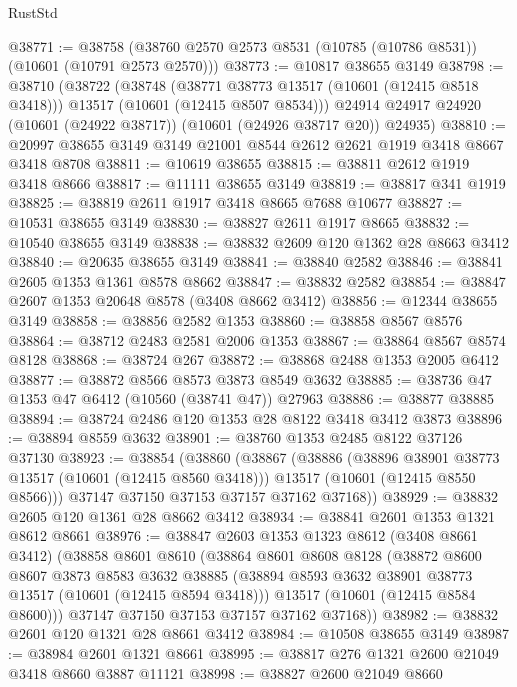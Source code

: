 \begin{lexlean}{RustStd}
\begin{coremodule}
@38771 := @38758 (@38760 @2570 @2573 @8531 (@10785 (@10786 @8531)) (@10601 (@10791 @2573 @2570)))
@38773 := @10817 @38655 @3149
@38798 := @38710
    (@38722
      (@38748
        (@38771 @38773 @13517 (@10601 (@12415 @8518 @3418)))
        @13517
        (@10601 (@12415 @8507 @8534)))
      @24914
      @24917
      @24920
      (@10601 (@24922 @38717))
      (@10601 (@24926 @38717 @20))
      @24935)
@38810 := @20997 @38655 @3149 @3149 @21001 @8544 @2612 @2621 @1919 @3418 @8667 @3418 @8708
@38811 := @10619 @38655
@38815 := @38811 @2612 @1919 @3418 @8666
@38817 := @11111 @38655 @3149
@38819 := @38817 @341 @1919
@38825 := @38819 @2611 @1917 @3418 @8665 @7688 @10677
@38827 := @10531 @38655 @3149
@38830 := @38827 @2611 @1917 @8665
@38832 := @10540 @38655 @3149
@38838 := @38832 @2609 @120 @1362 @28 @8663 @3412
@38840 := @20635 @38655 @3149
@38841 := @38840 @2582
@38846 := @38841 @2605 @1353 @1361 @8578 @8662
@38847 := @38832 @2582
@38854 := @38847 @2607 @1353 @20648 @8578 (@3408 @8662 @3412)
@38856 := @12344 @38655 @3149
@38858 := @38856 @2582 @1353
@38860 := @38858 @8567 @8576
@38864 := @38712 @2483 @2581 @2006 @1353
@38867 := @38864 @8567 @8574 @8128
@38868 := @38724 @267
@38872 := @38868 @2488 @1353 @2005 @6412
@38877 := @38872 @8566 @8573 @3873 @8549 @3632
@38885 := @38736 @47 @1353 @47 @6412 (@10560 (@38741 @47)) @27963
@38886 := @38877 @38885
@38894 := @38724 @2486 @120 @1353 @28 @8122 @3418 @3412 @3873
@38896 := @38894 @8559 @3632
@38901 := @38760 @1353 @2485 @8122 @37126 @37130
@38923 := @38854
    (@38860
      (@38867
        (@38886
          (@38896 @38901 @38773 @13517 (@10601 (@12415 @8560 @3418)))
          @13517
          (@10601 (@12415 @8550 @8566)))
        @37147
        @37150
        @37153
        @37157
        @37162
        @37168))
@38929 := @38832 @2605 @120 @1361 @28 @8662 @3412
@38934 := @38841 @2601 @1353 @1321 @8612 @8661
@38976 := @38847
    @2603
    @1353
    @1323
    @8612
    (@3408 @8661 @3412)
    (@38858
      @8601
      @8610
      (@38864
        @8601
        @8608
        @8128
        (@38872
          @8600
          @8607
          @3873
          @8583
          @3632
          @38885
          (@38894 @8593 @3632 @38901 @38773 @13517 (@10601 (@12415 @8594 @3418)))
          @13517
          (@10601 (@12415 @8584 @8600)))
        @37147
        @37150
        @37153
        @37157
        @37162
        @37168))
@38982 := @38832 @2601 @120 @1321 @28 @8661 @3412
@38984 := @10508 @38655 @3149
@38987 := @38984 @2601 @1321 @8661
@38995 := @38817 @276 @1321 @2600 @21049 @3418 @8660 @3887 @11121
@38998 := @38827 @2600 @21049 @8660

\end{coremodule}
\end{lexlean}
